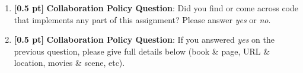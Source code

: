 \documentclass{article}
\begin{document}
\begin{enumerate}
    \item \textbf{[0.5 pt]} \textbf{Collaboration Policy Question}: Did you find or come across code that implements any part of this assignment? Please answer \textit{yes} or \textit{no}.
    \begin{tcolorbox}[width=\linewidth/3,height=1.5cm]
    \end{tcolorbox}
    
    \item \textbf{[0.5 pt]} \textbf{Collaboration Policy Question}: If you answered \textit{yes} on the previous question, please give full details below (book \& page, URL \& location, movies \& scene, etc).
    \begin{tcolorbox}[height=1.5cm]
    \end{tcolorbox}
    
    
    
    
    
    
    
    
    
\end{enumerate}
\end{document}
